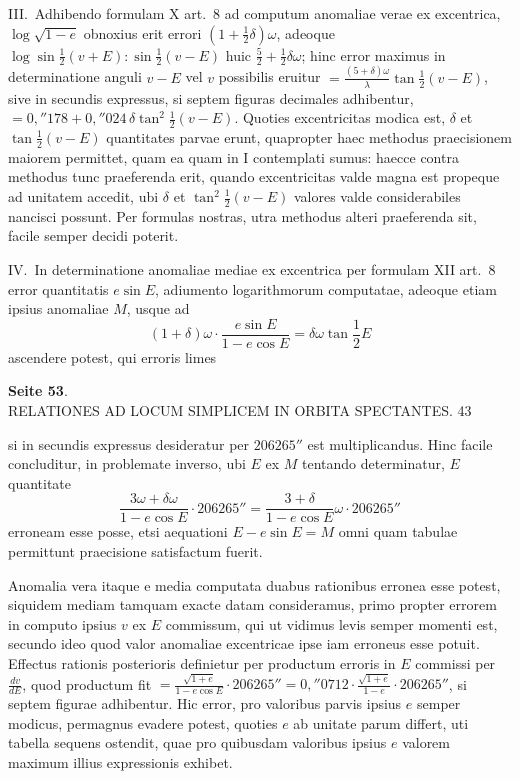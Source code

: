 \documentclass[12pt,a4paper]{article}
\begin{document}
III.~Adhibendo formulam X art.~8 ad computum anomaliae verae ex excentrica, $\log \sqrt{1-e}$ obnoxius erit errori $(1 + \frac{1}{2}\delta)\omega$, adeoque $\log \sin \frac{1}{2}(v+E) : \sin \frac{1}{2}(v-E)$ huic $\frac{5}{2} + \frac{1}{2}\delta\omega$; hinc error maximus in determinatione anguli $v - E$ vel $v$ possibilis eruitur $= \frac{(5 + \delta)\omega}{\lambda} \tan \frac{1}{2}(v - E)$, sive in secundis expressus, si septem figuras decimales adhibentur, $= 0{,}''178 + 0{,}''024\,\delta \tan^2 \frac{1}{2}(v - E)$. Quoties excentricitas modica est, $\delta$ et $\tan \frac{1}{2}(v - E)$ quantitates parvae erunt, quapropter haec methodus praecisionem maiorem permittet, quam ea quam in I contemplati sumus: haecce contra methodus tunc praeferenda erit, quando excentricitas valde magna est propeque ad unitatem accedit, ubi $\delta$ et $\tan^2 \frac{1}{2}(v - E)$ valores valde considerabiles nancisci possunt. Per formulas nostras, utra methodus alteri praeferenda sit, facile semper decidi poterit.

IV.~In determinatione anomaliae mediae ex excentrica per formulam XII art.~8 error quantitatis $e \sin E$, adiumento logarithmorum computatae, adeoque etiam ipsius anomaliae $M$, usque ad
\[
(1 + \delta)\omega \cdot \frac{e \sin E}{1 - e \cos E} = \delta \omega \tan \frac{1}{2}E
\]
ascendere potest, qui erroris limes

\textbf{Seite 53}.\\
RELATIONES AD LOCUM SIMPLICEM IN ORBITA SPECTANTES. 43

si in secundis expressus desideratur per $206265''$ est multiplicandus. Hinc facile concluditur, in problemate inverso, ubi $E$ ex $M$ tentando determinatur, $E$ quantitate
\[
\frac{3\omega + \delta\omega}{1 - e \cos E} \cdot 206265'' = \frac{3 + \delta}{1 - e \cos E}\omega \cdot 206265''
\]
erroneam esse posse, etsi aequationi $E - e \sin E = M$ omni quam tabulae permittunt praecisione satisfactum fuerit.

Anomalia vera itaque e media computata duabus rationibus erronea esse potest, siquidem mediam tamquam exacte datam consideramus, primo propter errorem in computo ipsius $v$ ex $E$ commissum, qui ut vidimus levis semper momenti est, secundo ideo quod valor anomaliae excentricae ipse iam erroneus esse potuit. Effectus rationis posterioris definietur per productum erroris in $E$ commissi per $\frac{dv}{dE}$, quod productum fit $= \frac{\sqrt{1+e}}{1 - e \cos E} \cdot 206265'' = 0{,}''0712 \cdot \frac{\sqrt{1+e}}{1-e} \cdot 206265''$, si septem figurae adhibentur. Hic error, pro valoribus parvis ipsius $e$ semper modicus, permagnus evadere potest, quoties $e$ ab unitate parum differt, uti tabella sequens ostendit, quae pro quibusdam valoribus ipsius $e$ valorem maximum illius expressionis exhibet.
\end{document}
